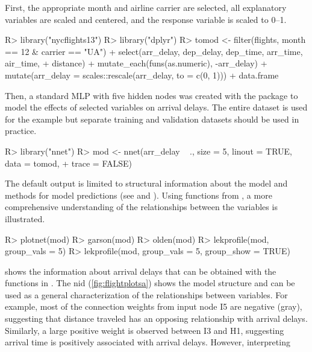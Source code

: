 \documentclass[article]{jss}
\begin{document}
First, the appropriate month and airline carrier are selected, all
explanatory variables are scaled and centered, and the response variable is
scaled to 0--1.
%
\begin{Schunk}
\begin{Sinput}
R> library("nycflights13")
R> library("dplyr")
R> tomod <- filter(flights, month == 12 & carrier == "UA") %
+    select(arr_delay, dep_delay, dep_time, arr_time, air_time,
+      distance) %
+    mutate_each(funs(as.numeric), -arr_delay) %
+    mutate(arr_delay = scales::rescale(arr_delay, to = c(0, 1))) %
+    data.frame
\end{Sinput}
\end{Schunk}
%
Then, a standard MLP with five hidden nodes was created with the
 package to model the effects of selected variables on
arrival delays. The entire dataset is used for the example but
separate training and validation datasets should be used in practice.
%
\begin{Schunk}
\begin{Sinput}
R> library("nnet")
R> mod <- nnet(arr_delay ~ ., size = 5, linout = TRUE, data = tomod,
+    trace = FALSE)  
\end{Sinput}
\end{Schunk}
%
The default output is limited to structural information about the model and methods for model predictions (see  and ). Using functions from , a more comprehensive understanding of the relationships between the variables is illustrated.
%
\begin{Schunk}
\begin{Sinput}
R> plotnet(mod)
R> garson(mod)
R> olden(mod)
R> lekprofile(mod, group_vals = 5)
R> lekprofile(mod, group_vals = 5, group_show = TRUE)
\end{Sinput}
\end{Schunk}
%
 shows the information about arrival delays that
can be obtained with the functions in . The
\ac{nid} (\ref{fig:flightplotsa}) shows the model structure and can be
used as a general characterization of the relationships between
variables.  For example, most of the connection weights from input
node I5 are negative (gray), suggesting that distance traveled has an
opposing relationship with arrival delays. Similarly, a large positive
weight is observed between I3 and H1, suggesting arrival time is
positively associated with arrival delays.  However, interpreting
\end{document}
